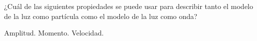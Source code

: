 ¿Cuál de las siguientes propiedades se puede usar para describir
tanto el modelo de la luz como partícula como el modelo de la luz como onda?

\begin{oneparcheckboxes}
    \choice Amplitud.
    \choice Momento.
    \CorrectChoice Velocidad.
\end{oneparcheckboxes}
